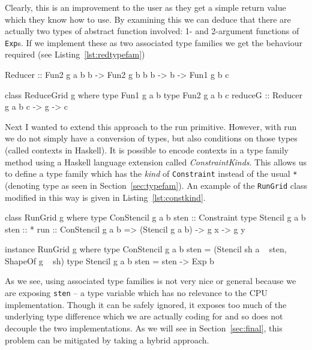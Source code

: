 \documentclass[12pt,a4paper,twoside]{scrbook}
\begin{document}
Clearly, this is an improvement to the user as they get a simple return value
which they know how to use. By examining this we can deduce that there are
actually two types of abstract function involved: 1- and 2-argument functions of
\texttt{Exp}s. If we implement these as two associated type families we get the
behaviour required (see Listing~\ref{lst:redtypefam})

\begin{hflisting}[label={lst:redtypefam}, caption={The application of type
    families to the reduce primitive.}]
Reducer :: Fun2 g a b b
        -> Fun2 g b b b
        -> b
        -> Fun1 g b c

class ReduceGrid g where
    type Fun1 g a b
    type Fun2 g a b c
    reduceG :: Reducer g a b c -> g -> c
\end{hflisting}

Next I wanted to extend this approach to the run primitive. However, with run we
do not simply have a conversion of types, but also conditions on those types
(called contexts in Haskell). It is possible to encode contexts in a type family
method using a Haskell language extension called \emph{ConstraintKinds}. This
allows us to define a type family which has the \emph{kind} of
\texttt{Constraint} instead of the usual \texttt{*} (denoting type as seen in
Section~\ref{sec:typefam}). An example of the \texttt{RunGrid} class modified in
this way is given in Listing~\ref{lst:constkind}.

\begin{hflisting}[label={lst:constkind}, caption={The application of type
    families to the run primitive.}]
class RunGrid g where
    type ConStencil g a b sten :: Constraint
    type Stencil g a b sten :: *
    run :: ConStencil g a b => (Stencil g a b) -> g x -> g y

instance RunGrid g where
    type ConStencil g a b sten = (Stencil sh a ~ sten, ShapeOf g ~ sh)
    type Stencil g a b sten = sten -> Exp b
\end{hflisting}

As we see, using associated type families is not very nice or general because we
are exposing \texttt{sten} -- a type variable which has no relevance to the CPU
implementation. Though it can be safely ignored, it exposes too much of the
underlying type difference which we are actually coding for and so does not
decouple the two implementations. As we will see in Section~\ref{sec:final},
this problem can be mitigated by taking a hybrid approach.
\end{document}
